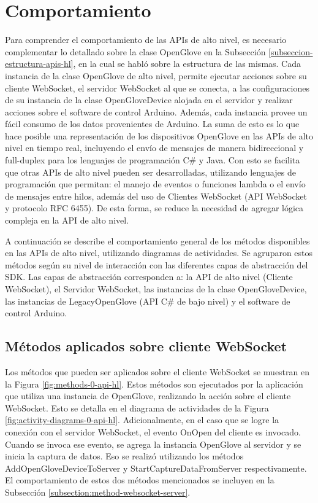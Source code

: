 \section{Comportamiento}
\label{seccion-comportamiento-apis}
Para comprender el comportamiento de las APIs de alto nivel, es necesario complementar lo detallado sobre la clase OpenGlove en la Subsección \ref{subseccion-estructura-apis-hl}, en la cual se habló sobre la estructura de las mismas. Cada instancia de la clase OpenGlove de alto nivel, permite ejecutar acciones sobre su cliente WebSocket, el servidor WebSocket al que se conecta, a las configuraciones de su instancia de la clase OpenGloveDevice alojada en el servidor y realizar acciones sobre el software de control Arduino. Además, cada instancia provee un fácil consumo de los datos provenientes de Arduino. La suma de esto es lo que hace posible una representación de los dispositivos OpenGlove en las APIs de alto nivel en tiempo real, incluyendo el envío de mensajes de manera bidireccional y full-duplex para los lenguajes de programación C\# y Java. Con esto se facilita que otras APIs de alto nivel pueden ser desarrolladas, utilizando lenguajes de programación que permitan: el manejo de eventos o funciones lambda o el envío de mensajes entre hilos, además del uso de Clientes WebSocket (API WebSocket y protocolo RFC 6455). De esta forma, se reduce la necesidad de agregar lógica compleja en la API de alto nivel.

A continuación se describe el comportamiento general de los métodos disponibles en las APIs de alto nivel, utilizando diagramas de actividades. Se agruparon estos métodos según su nivel de interacción con las diferentes capas de abstracción del SDK. Las capas de abstracción corresponden a: la API de alto nivel (Cliente WebSocket), el Servidor WebSocket, las instancias de la clase OpenGloveDevice, las instancias de LegacyOpenGlove (API C\# de bajo nivel) y el software de control Arduino.



\subsection{Métodos aplicados sobre cliente WebSocket}
\label{subsection:method-websocket-client}

Los métodos que pueden ser aplicados sobre el cliente WebSocket se muestran en la Figura \ref{fig:methods-0-api-hl}. Estos métodos son ejecutados por la aplicación que utiliza una instancia de OpenGlove, realizando la acción sobre el cliente WebSocket. Esto se detalla en el diagrama de actividades de la Figura \ref{fig:activity-diagrams-0-api-hl}. Adicionalmente, en el caso que se logre la conexión con el servidor WebSocket, el evento OnOpen del cliente es invocado. Cuando se invoca ese evento, se agrega la instancia OpenGlove al servidor  y se inicia la captura de datos. Eso se realizó utilizando los métodos AddOpenGloveDeviceToServer y StartCaptureDataFromServer respectivamente. El comportamiento de estos dos métodos mencionados se incluyen en la Subsección \ref{subsection:method-websocket-server}.

